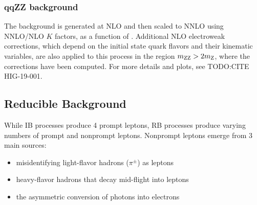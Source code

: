 \subsubsection{qqZZ background}
The \qqzzfourl background is generated at NLO and then scaled to NNLO using NNLO/NLO $K$ factors,
as a function of \mass{\ZZ}. Additional NLO electroweak corrections, which depend on the initial state quark flavors and their
kinematic variables, are also applied to this process in the region $m_{\mathrm{Z}\mathrm{Z}} > 2m_{\mathrm{Z}}$, where the corrections have been computed. 
For more details and plots, see TODO:CITE HIG-19-001.

\subsection{Reducible Background}
\label{sec:redbkg}
While IB processes produce 4 prompt leptons, RB processes produce varying numbers of prompt and nonprompt leptons.
Nonprompt leptons emerge from 3 main sources:
\begin{itemize}
    \item misidentifying light-flavor hadrons (\eg $\pi^{\pm}$) as leptons
    \item heavy-flavor hadrons that decay mid-flight into leptons
    \item the asymmetric conversion of photons into electrons
\end{itemize}

